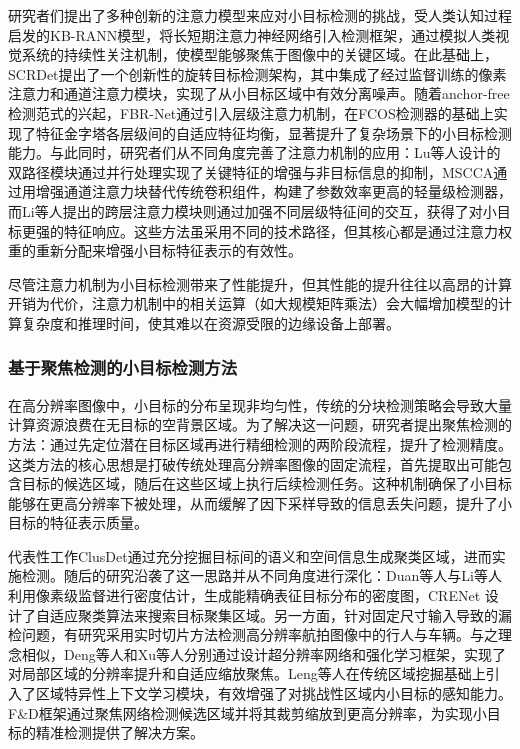 研究者们提出了多种创新的注意力模型来应对小目标检测的挑战，受人类认知过程启发的KB-RANN模型\cite{yi2019kbrcann}，将长短期注意力神经网络引入检测框架，通过模拟人类视觉系统的持续性关注机制，使模型能够聚焦于图像中的关键区域。在此基础上，SCRDet\cite{Yang2019SCRDet}提出了一个创新性的旋转目标检测架构，其中集成了经过监督训练的像素注意力和通道注意力模块，实现了从小目标区域中有效分离噪声。随着anchor-free检测范式的兴起，FBR-Net\cite{Fu2021AnchorFree}通过引入层级注意力机制，在FCOS\cite{Tian2022FCOS}检测器的基础上实现了特征金字塔各层级间的自适应特征均衡，显著提升了复杂场景下的小目标检测能力。与此同时，研究者们从不同角度完善了注意力机制的应用：Lu等人\cite{Lu2021AttentionFFSSD}设计的双路径模块通过并行处理实现了关键特征的增强与非目标信息的抑制，MSCCA\cite{Ran2021Lightweight}通过用增强通道注意力块替代传统卷积组件，构建了参数效率更高的轻量级检测器，而Li等人\cite{Li2021CrossLayerAN}提出的跨层注意力模块则通过加强不同层级特征间的交互，获得了对小目标更强的特征响应。这些方法虽采用不同的技术路径，但其核心都是通过注意力权重的重新分配来增强小目标特征表示的有效性。

尽管注意力机制为小目标检测带来了性能提升，但其性能的提升往往以高昂的计算开销为代价\cite{DZYX202308035}，注意力机制中的相关运算（如大规模矩阵乘法）会大幅增加模型的计算复杂度和推理时间，使其难以在资源受限的边缘设备上部署。

\subsubsection{基于聚焦检测的小目标检测方法}
在高分辨率图像中，小目标的分布呈现非均匀性，传统的分块检测策略会导致大量计算资源浪费在无目标的空背景区域。为了解决这一问题，研究者提出聚焦检测的方法：通过先定位潜在目标区域再进行精细检测的两阶段流程，提升了检测精度。这类方法的核心思想是打破传统处理高分辨率图像的固定流程，首先提取出可能包含目标的候选区域，随后在这些区域上执行后续检测任务。这种机制确保了小目标能够在更高分辨率下被处理，从而缓解了因下采样导致的信息丢失问题，提升了小目标的特征表示质量。

代表性工作ClusDet\cite{Yang2019ClusteredOD}通过充分挖掘目标间的语义和空间信息生成聚类区域，进而实施检测。随后的研究沿袭了这一思路并从不同角度进行深化：Duan等人\cite{Duan2021CoarseGrainedDM}与Li等人\cite{Li2020DMGOD}利用像素级监督进行密度估计，生成能精确表征目标分布的密度图，CRENet\cite{Wang2020ClusteringADR} 设计了自适应聚类算法来搜索目标聚集区域。另一方面，针对固定尺寸输入导致的漏检问题，有研究采用实时切片方法检测高分辨率航拍图像中的行人与车辆。与之理念相似，Deng等人\cite{Deng2021GLSAN}和Xu等人\cite{Xu2021AdaZoom}分别通过设计超分辨率网络和强化学习框架，实现了对局部区域的分辨率提升和自适应缩放聚焦。Leng等人\cite{Leng2023ParetoRefocusing}在传统区域挖掘基础上引入了区域特异性上下文学习模块，有效增强了对挑战性区域内小目标的感知能力。F\&D框架\cite{Koyun2022FocusAndDetect}通过聚焦网络检测候选区域并将其裁剪缩放到更高分辨率，为实现小目标的精准检测提供了解决方案。

